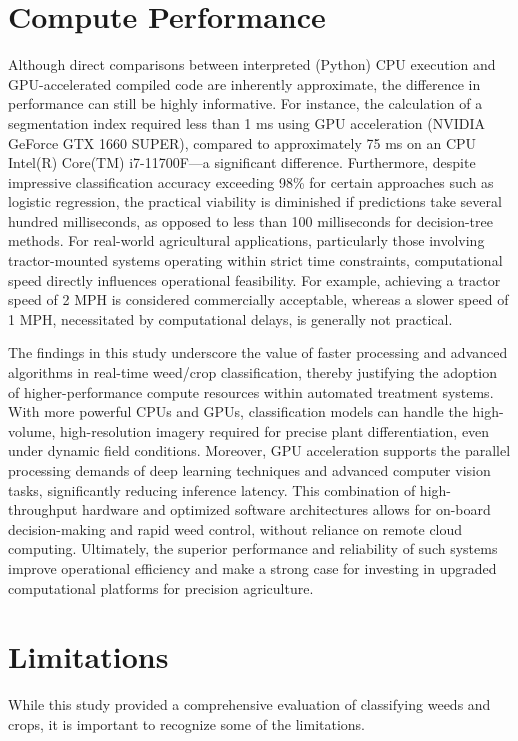 \documentclass[letterpaper, notitlepage]{report}
\begin{document}
\section{Compute Performance}
\label{section:compute}
Although direct comparisons between interpreted (Python) CPU execution and GPU-accelerated compiled code are inherently approximate, the difference in performance can still be highly informative. For instance, the calculation of a segmentation index required less than 1 ms using GPU acceleration (NVIDIA GeForce GTX 1660 SUPER), compared to approximately 75 ms on an CPU Intel(R) Core(TM) i7-11700F—a significant difference. Furthermore, despite impressive classification accuracy exceeding 98\% for certain approaches such as logistic regression, the practical viability is diminished if predictions take several hundred milliseconds, as opposed to less than 100 milliseconds for decision-tree methods. For real-world agricultural applications, particularly those involving tractor-mounted systems operating within strict time constraints, computational speed directly influences operational feasibility. For example, achieving a tractor speed of 2 MPH is considered commercially acceptable, whereas a slower speed of 1 MPH, necessitated by computational delays, is generally not practical.

The findings in this study underscore the value of faster processing and advanced algorithms in real-time weed/crop classification, thereby justifying the adoption of higher-performance compute resources within automated treatment systems. With more powerful CPUs and GPUs, classification models can handle the high-volume, high-resolution imagery required for precise plant differentiation, even under dynamic field conditions. Moreover, GPU acceleration supports the parallel processing demands of deep learning techniques and advanced computer vision tasks, significantly reducing inference latency. This combination of high-throughput hardware and optimized software architectures allows for on-board decision-making and rapid weed control, without reliance on remote cloud computing. Ultimately, the superior performance and reliability of such systems improve operational efficiency and make a strong case for investing in upgraded computational platforms for precision agriculture.

\section{Limitations}
\label{section:limitations}
While this study provided a comprehensive evaluation of classifying weeds and crops, it is important to recognize some of the limitations.
\end{document}
